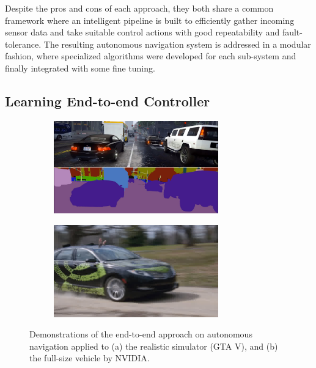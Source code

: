 \documentclass[../thesis.tex]{subfiles}
\begin{document}
 
Despite the pros and cons of each approach, they both share a common framework where an intelligent pipeline is built to efficiently gather incoming sensor data and take suitable control actions with good repeatability and fault-tolerance. 
The resulting autonomous navigation system is addressed in a modular fashion, where specialized algorithms were developed for each sub-system and finally integrated with some fine tuning.
 
 
\subsection{Learning End-to-end Controller}
 
\begin{figure}[b]
    \centering
    \begin{subfigure}[b]{0.45\linewidth}
        \includegraphics[height=4cm]{./Introduction/fig/gta.jpg}
    \end{subfigure}
    \begin{subfigure}[b]{0.45\linewidth}
        \includegraphics[height=4cm]{./Introduction/fig/nvidia.jpg}
    \end{subfigure}
    \caption{Demonstrations of the end-to-end approach on autonomous navigation applied to (a) the realistic simulator (GTA V), and (b) the full-size vehicle by NVIDIA\cite{nvidiacar}.}
    \label{fig:end-to-end}
\end{figure}
 
 
\end{document}

